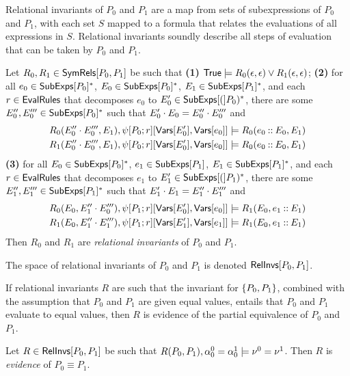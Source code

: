 Relational invariants of $P_0$ and $P_1$ are a map from sets of
subexpressions of $P_0$ and $P_1$, with each set $S$ mapped to a
formula that relates the evaluations of all expressions in $S$.
%
Relational invariants soundly describe all steps of evaluation that
can be taken by $P_0$ and $P_1$.
\begin{defn}
  \label{defn:rel-invs}
  Let $R_0, R_1 \in \mathsf{SymRels}[ P_0, P_1 ]$ be such that %
  \textbf{(1)} $\mathsf{True} \models R_0(\epsilon, \epsilon) \lor
  R_1(\epsilon, \epsilon)$;
  \textbf{(2)} for all $e_0 \in \mathsf{SubExps}[ P_0 ]^{*}$, %
  $E_0 \in \mathsf{SubExps}[ P_0 ]^{*}$, %
  $E_1 \in \mathsf{SubExps}[ P_1 ]^{*}$, and %
  each $r \in \mathsf{EvalRules}$ that decomposes $e_0$ to $E_0' \in
  \mathsf{SubExps}[ ( ]P_0)^{*}$, %
  there are some $E_0'', E_0''' \in \mathsf{SubExps}[ P_0 ]^{*}$ such that $E_0'
  \cdot E_0 = E_0'' \cdot E_0'''$ and
  \begin{align*}
    R_0(E_0'' \concat E_0''', E_1), %
    \subs{ \symstep{P_0}{ r } }{ \vars[ E_0' ], \vars[ e_0 ] } 
    & \entails R_0(e_0 \cons E_0, E_1) \\
    R_1(E_0'' \concat E_0''', E_1), %
    \subs{ \symstep{P_0}{ r } }{ \vars[ E_0' ], \vars[ e_0 ] }
    & \entails R_0(e_0 \cons E_0, E_1)
  \end{align*}
  \textbf{(3)} for all $E_0 \in \mathsf{SubExps}[ P_0 ]^{*}$, %
  $e_1 \in \mathsf{SubExps}[ P_1 ]$, %
  $E_1 \in \mathsf{SubExps}[ P_1 ]^{*}$, and %
  each $r \in \mathsf{EvalRules}$ that decomposes $e_1$ to $E_1' \in
  \mathsf{SubExps}[ ( ]P_1)^{*}$, %
  there are some $E_1'', E_1''' \in \mathsf{SubExps}[ P_1 ]^{*}$ such that
  $E_1' \cdot E_1 = E_1'' \cdot E_1'''$ and
  \begin{align*}
    R_0(E_0, E_1'' \concat E_0'''), %
    \subs{ \symstep{P_1}{ r } }{ \vars[ E_0' ], \vars[ e_0 ] }
    & \entails R_1(E_0, e_1 \cons E_1) \\
    R_1(E_0, E_1'' \concat E_1'''), %
    \subs{ \symstep{P_1}{ r } }{ \vars[ E_1' ], \vars[ e_1 ] }
    & \entails R_1(E_0, e_1 \cons E_1) 
  \end{align*}
  Then $R_0$ and $R_1$ are \emph{relational invariants} of $P_0$ and
  $P_1$.
\end{defn}
%
The space of relational invariants of $P_0$ and $P_1$ is denoted
$\mathsf{RelInvs}[ P_0, P_1 ]$.

If relational invariants $R$ are such that the invariant for $\{ 
  P_0, P_1  \}$, combined with the assumption that $P_0$ and $P_1$ are
given equal values, entails that $P_0$ and $P_1$ evaluate to equal
values, then $R$ is evidence of the partial equivalence of $P_0$ and
$P_1$.
%
\begin{defn}
  \label{defn:eq-pf}
  Let $R \in \mathsf{RelInvs}[ P_0, P_1 ]$ be such that $R(P_0, P_1), \alpha^0_0
  = \alpha^1_0 \models \nu^0 = \nu^1$.
  Then $R$ is \emph{evidence} of $P_0 \equiv P_1$.
\end{defn}

